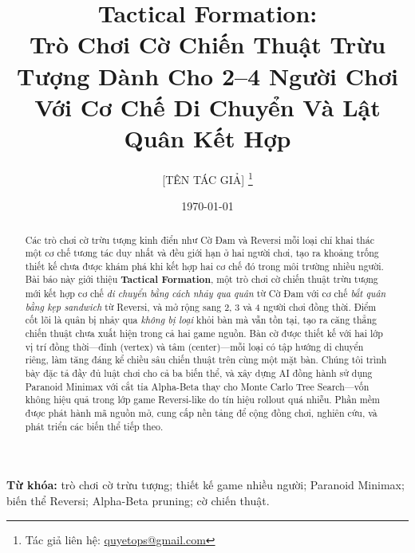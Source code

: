 \documentclass[12pt, a4paper]{article}
\title{%
  \textbf{Tactical Formation:}\\[0.3em]
  \textbf{Trò Chơi Cờ Chiến Thuật Trừu Tượng Dành Cho 2--4 Người Chơi}\\[0.3em]
  \textbf{Với Cơ Chế Di Chuyển Và Lật Quân Kết Hợp}
}
\author{%
  [TÊN TÁC GIẢ]%
  \thanks{Tác giả liên hệ: \href{mailto:quyetops@gmail.com}{quyetops@gmail.com}}
}
\affil{Independent Researcher, Việt Nam}
\date{\today}
\begin{document}

\maketitle

\begin{abstract}
Các trò chơi cờ trừu tượng kinh điển như Cờ Đam và Reversi mỗi loại chỉ
khai thác một cơ chế tương tác duy nhất và đều giới hạn ở hai người chơi,
tạo ra khoảng trống thiết kế chưa được khám phá khi kết hợp hai cơ chế
đó trong môi trường nhiều người.
Bài báo này giới thiệu \textbf{Tactical Formation}, một trò chơi cờ chiến
thuật trừu tượng mới kết hợp cơ chế \emph{di chuyển bằng cách nhảy qua quân}
từ Cờ Đam với cơ chế \emph{bắt quân bằng kẹp sandwich} từ Reversi,
và mở rộng sang 2, 3 và 4 người chơi đồng thời.
Điểm cốt lõi là quân bị nhảy qua \emph{không bị loại} khỏi bàn mà vẫn tồn tại,
tạo ra căng thẳng chiến thuật chưa xuất hiện trong cả hai game nguồn.
Bàn cờ được thiết kế với hai lớp vị trí đồng thời---đỉnh (vertex) và tâm
(center)---mỗi loại có tập hướng di chuyển riêng, làm tăng đáng kể chiều
sâu chiến thuật trên cùng một mặt bàn.
Chúng tôi trình bày đặc tả đầy đủ luật chơi cho cả ba biến thể,
và xây dựng AI đồng hành sử dụng Paranoid Minimax với cắt tỉa Alpha-Beta
thay cho Monte Carlo Tree Search---vốn không hiệu quả trong lớp game
Reversi-like do tín hiệu rollout quá nhiễu.
Phần mềm được phát hành mã nguồn mở, cung cấp nền tảng để cộng đồng
chơi, nghiên cứu, và phát triển các biến thể tiếp theo.
\end{abstract}

\vspace{0.4em}
\noindent\textbf{Từ khóa:}
trò chơi cờ trừu tượng;
thiết kế game nhiều người;
Paranoid Minimax;
biến thể Reversi;
Alpha-Beta pruning;
cờ chiến thuật.
\end{document}
